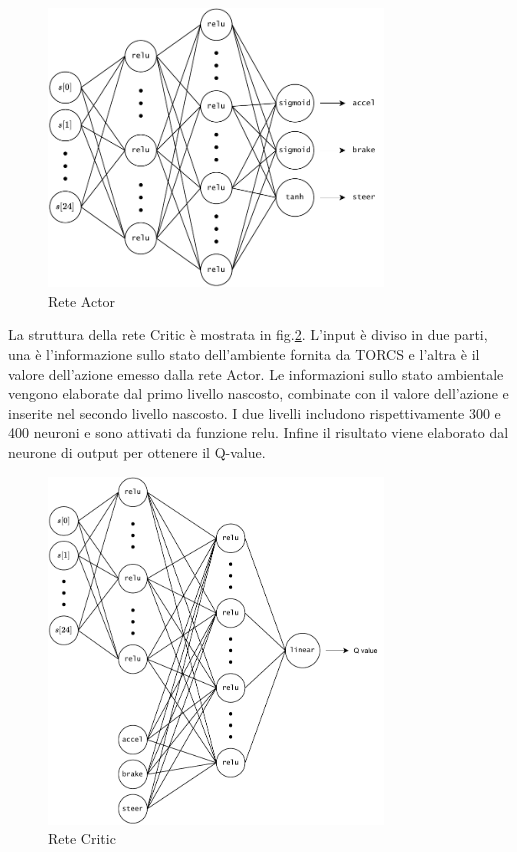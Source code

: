 \begin{figure}[hb]
    \center
    \includegraphics[width = 3.5in]{Figures/Chapter4/ddpg_actor_network.drawio.pdf}
    \caption{Rete Actor}
    \label{fig:actor_network}
\end{figure}

\clearpage

La struttura della rete Critic è mostrata in fig.\ref{fig:critic_network}. L'input è diviso in due parti, una è l'informazione sullo stato dell'ambiente fornita da TORCS e l'altra è il valore dell'azione emesso dalla rete Actor. Le informazioni sullo stato ambientale vengono elaborate dal primo livello nascosto, combinate con il valore dell'azione e inserite nel secondo livello nascosto. I due livelli includono rispettivamente 300 e 400 neuroni e sono attivati da funzione relu. Infine il risultato viene elaborato dal neurone di output per ottenere il Q-value.

\begin{figure}[hb]
    \center
    \includegraphics[width = 3.5in]{Figures/Chapter4/ddpg_critic_network.drawio.pdf}
    \caption{Rete Critic}
    \label{fig:critic_network}
\end{figure}

